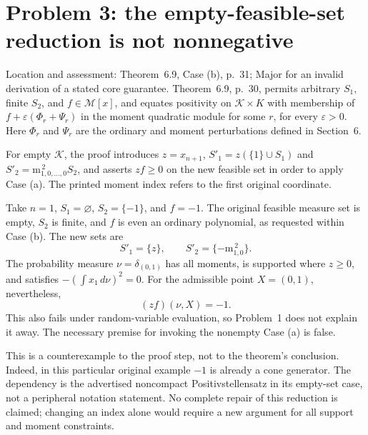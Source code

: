 \documentclass[10pt]{article}
\begin{document}
\section*{Problem 3: the empty-feasible-set reduction is not nonnegative}
Location and assessment: Theorem 6.9, Case (b), p. 31; Major for an invalid derivation of a stated core guarantee. Theorem 6.9, p. 30, permits arbitrary \(S_1\), finite \(S_2\), and \(f\in\mathcal M[x]\), and equates positivity on \(\mathcal K\times K\) with membership of \(f+\varepsilon(\Phi_r+\Psi_r)\) in the moment quadratic module for some \(r\), for every \(\varepsilon>0\). Here \(\Phi_r\) and \(\Psi_r\) are the ordinary and moment perturbations defined in Section 6.\par
For empty \(\mathcal K\), the proof introduces \(z=x_{n+1}\), \(S'_1=z(\{1\}\cup S_1)\) and \(S'_2=\mathrm{m}_{1,0,\ldots,0}^{\,2}S_2\), and asserts \(zf\ge0\) on the new feasible set in order to apply Case (a). The printed moment index refers to the first original coordinate.\par
Take \(n=1\), \(S_1=\varnothing\), \(S_2=\{-1\}\), and \(f=-1\). The original feasible measure set is empty, \(S_2\) is finite, and \(f\) is even an ordinary polynomial, as requested within Case (b). The new sets are \[S'_1=\{z\},\qquad S'_2=\{-\mathrm{m}_{1,0}^{\,2}\}.\] The probability measure \(\nu=\delta_{(0,1)}\) has all moments, is supported where \(z\ge0\), and satisfies \(-(\int x_1\,d\nu)^2=0\). For the admissible point \(X=(0,1)\), nevertheless, \[(zf)(\nu,X)=-1.\] This also fails under random-variable evaluation, so Problem 1 does not explain it away. The necessary premise for invoking the nonempty Case (a) is false.\par
This is a counterexample to the proof step, not to the theorem’s conclusion. Indeed, in this particular original example \(-1\) is already a cone generator. The dependency is the advertised noncompact Positivstellensatz in its empty-set case, not a peripheral notation statement. No complete repair of this reduction is claimed; changing an index alone would require a new argument for all support and moment constraints.\par
\end{document}
